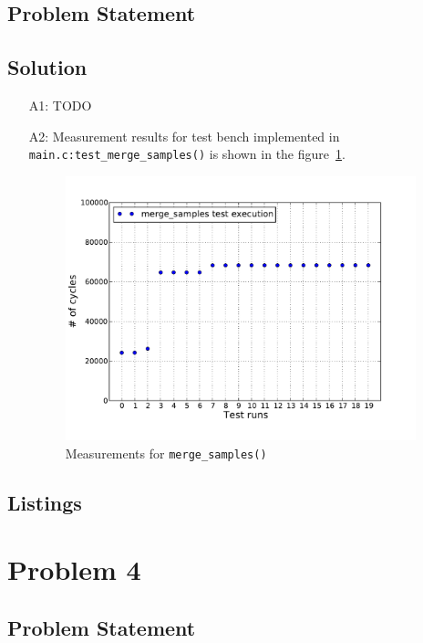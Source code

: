 \documentclass[12pt,a4paper,titlepage,oneside]{article}
\begin{document}
\subsection{Problem Statement}


\subsection{Solution}
\begin{itemize}

\item[A1:]
  TODO

\item[A2:]
  Measurement results for test bench implemented in
  \texttt{main.c:test\_merge\_samples()} is shown in the
  figure~\ref{fig:mergeSamples}.

\begin{figure}[hb!]
  \centering
  \includegraphics[width=4in]{q3_2_merge_samples}
  \caption
  {Measurements for \texttt{merge\_samples()}}
	\label{fig:mergeSamples}
\end{figure}

\end{itemize}

\subsection{Listings}

\newpage
\section{Problem 4}

\subsection{Problem Statement}

\end{document}
